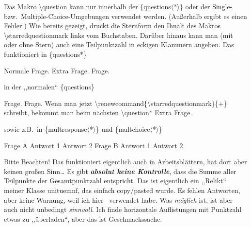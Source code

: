 \documentclass[hyperworksheet]{drcschool}
\newcommand*{\cs}[1]{\textup{\ttfamily\textbackslash#1}}                   %
\newcommand*{\str}[1]{\textup{\ttfamily\string#1}}                         %
\newcommand*{\pkg}[1]{\textup{\ttfamily#1}}                                %
\newcommand*{\env}[1]{\textup{\ttfamily\{#1\}}}                            %
\newcommand*{\optstar}{\mbox{\ttfamily$\langle$*$\rangle$}}                %
\begin{document}
\begin{test}[2,M,class=9a,date=32.\ Oktober 2022,v=A,ptspre=>,ptspost=<,logo=example-image]
\exercise[2]
Das Makro \cs{question} kann nur innerhalb der \env{questions\optstar}
oder der Single- bzw.~Multiple-Choice-Umgebungen verwendet werden.
(Außerhalb ergibt es einen Fehler.) Wie bereits gezeigt, druckt die
Sternform den Ihnalt des Makros \cs{starredquestionmark}
links vom Buchstaben. Darüber hinaus kann man (mit oder ohne Stern)
auch eine Teilpunktzahl in eckigen Klammern angeben. Das funktioniert in
\env{questions*}
\begin{questions*}{3}
\question Normale Frage.
\question* Extra Frage.
\question[1] Frage.
\end{questions*}
in der ,,normalen`` \env{questions}
\begin{questions}
\question[0,5] Frage.
\question[2] Frage. Wenn man jetzt \cs{renewcommand\{\textbackslash starredquestionmark\}\{+\}} schreibt,
bekommt man beim nächsten \cs{question*}\renewcommand*{\starredquestionmark}{+}
\question*[1,5] Extra Frage.
\end{questions}
sowie z.B.~in \env{multresponse\optstar} und  \env{multchoice\optstar}
\begin{multresponse}
\question*[1] Frage A
\choice Antwort 1
\choice* Antwort 2
\question Frage B
\choice* Antwort 1
\choice* Antwort 2
\end{multresponse}
\begin{solution}
\answer Bitte Beachten!
\answer Das funktioniert eigentlich auch in Arbeitsblättern, hat dort aber keinen großen Sinn\ldots
\answer Es gibt {\itshape\bfseries absolut keine Kontrolle}, dass die Summe aller Teilpunkte der Gesamtpunktzahl entspricht.
\answer Das ist eigentlich ein ,,Relikt`` meiner Klasse \pkg{unituemnf}, das einfach copy/pasted wurde.
\answer Es fehlen Antworten, aber keine Warnung, weil ich hier \NoCheck\str\NoCheck\ verwendet habe.
\answer Was \emph{möglich} ist, ist aber auch nicht unbedingt \emph{sinnvoll}. Ich finde
horizontale Auf{}listungen mit Punktzahl etwas zu ,,überladen``, aber das ist Geschmackssache.
\end{solution}
\end{test}
\end{document}
